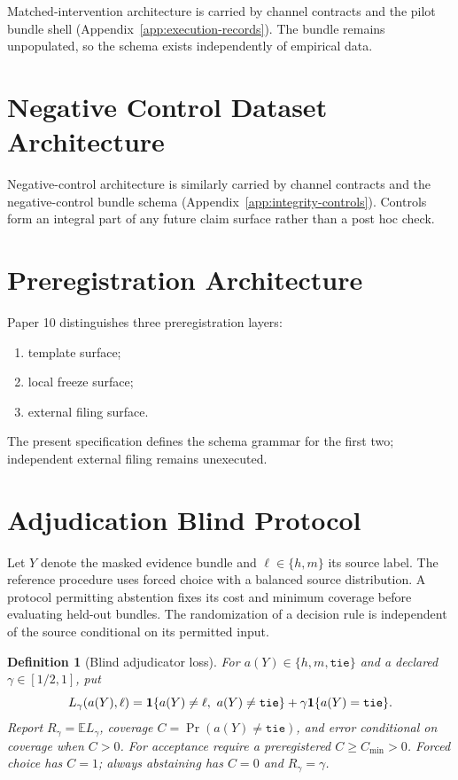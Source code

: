 \documentclass[11pt,a4paper]{article}
\newtheorem{definition}[theorem]{Definition}
\begin{document}
Matched-intervention architecture is carried by channel contracts and the
pilot bundle shell (Appendix~\ref{app:execution-records}). The bundle remains
unpopulated, so the schema exists independently of empirical data.

\section{Negative Control Dataset Architecture}

Negative-control architecture is similarly carried by channel contracts and the
negative-control bundle schema (Appendix~\ref{app:integrity-controls}). Controls form an integral part of
any future claim surface rather than a post hoc check.

\section{Preregistration Architecture}

Paper 10 distinguishes three preregistration layers:

\begin{enumerate}
\item template surface;
\item local freeze surface;
\item external filing surface.
\end{enumerate}

The present specification defines the schema grammar for the first two; independent external filing remains unexecuted.

\section{Adjudication Blind Protocol}

Let $Y$ denote the masked evidence bundle and $\ell\in\{h,m\}$ its source label. The reference procedure uses forced choice with a balanced source distribution. A protocol permitting abstention fixes its cost and minimum coverage before evaluating held-out bundles. The randomization of a decision rule is independent of the source conditional on its permitted input.

\begin{definition}[Blind adjudicator loss]
For $a(Y)\in\{h,m,\mathtt{tie}\}$ and a declared $\gamma\in[1/2,1]$, put
\[
 L_\gamma(a(Y),\ell)=
 {\bf1}\{a(Y)\ne\ell,\ a(Y)\ne\mathtt{tie}\}
 +\gamma{\bf1}\{a(Y)=\mathtt{tie}\}.
\]
Report $R_\gamma=\mathbb E L_\gamma$, coverage $C=\Pr(a(Y)\ne\mathtt{tie})$, and error conditional on coverage when $C>0$. For acceptance require a preregistered $C\ge C_{\min}>0$. Forced choice has $C=1$; always abstaining has $C=0$ and $R_\gamma=\gamma$.
\end{definition}
\end{document}
